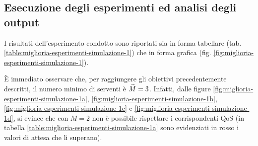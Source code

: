 \subsection{Esecuzione degli esperimenti ed analisi degli output}
I risultati dell'esperimento condotto sono riportati sia in forma tabellare (tab. \ref{table:miglioria-esperimenti-simulazione-1}) che in forma grafica (fig. \ref{fig:miglioria-esperimenti-simulazione-1}).

È immediato osservare che, per raggiungere gli obiettivi precedentemente descritti, il numero minimo di serventi è $\accentset{\sim}{M} = 3$. Infatti, dalle figure \ref{fig:miglioria-esperimenti-simulazione-1a}, \ref{fig:miglioria-esperimenti-simulazione-1b}, \ref{fig:miglioria-esperimenti-simulazione-1c} e \ref{fig:miglioria-esperimenti-simulazione-1d}, si evince che con $M = 2$ non è possibile rispettare i corrispondenti QoS (in tabella \ref{table:miglioria-esperimenti-simulazione-1a} sono evidenziati in {\color{red}rosso} i valori di attesa che li superano).

